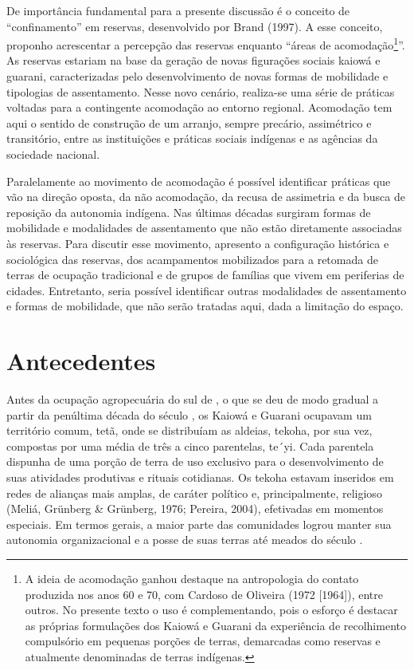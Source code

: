 De importância fundamental para a presente discussão é o conceito de
``confinamento'' em reservas, desenvolvido por Brand (1997). A esse
conceito, proponho acrescentar a percepção das reservas enquanto ``áreas
de acomodação\footnote{A ideia de acomodação ganhou destaque na
antropologia do contato produzida nos anos 60 e 70, com Cardoso de
Oliveira (1972 [1964]), entre outros. No presente texto o uso é
complementando, pois o esforço é destacar as próprias formulações dos
Kaiowá e Guarani da experiência de recolhimento compulsório em pequenas
porções de terras, demarcadas como reservas e atualmente denominadas de
terras indígenas. }''. As reservas estariam na base da geração de novas
figurações sociais kaiowá e guarani, caracterizadas pelo
desenvolvimento de novas formas de mobilidade e tipologias de
assentamento. Nesse novo cenário, realiza-se uma série de práticas
voltadas para a contingente acomodação ao entorno regional. Acomodação
tem aqui o sentido de construção de um arranjo, sempre precário,
assimétrico e transitório, entre as instituições e práticas sociais
indígenas e as agências da sociedade nacional.

Paralelamente ao movimento de acomodação é possível identificar práticas
que vão na direção oposta, da não acomodação, da recusa de assimetria e
da busca de reposição da autonomia indígena. Nas últimas décadas
surgiram formas de mobilidade e modalidades de assentamento que não
estão diretamente associadas às reservas. Para discutir esse movimento,
apresento a configuração histórica e sociológica das reservas, dos
acampamentos mobilizados para a retomada de terras de ocupação
tradicional e de grupos de famílias que vivem em periferias de cidades.
Entretanto, seria possível identificar outras modalidades de
assentamento e formas de mobilidade, que não serão tratadas aqui, dada
a limitação do espaço. 

\section{Antecedentes}

Antes da ocupação agropecuária do sul de , o que se deu de modo
gradual a partir da penúltima década do século , os Kaiowá e Guarani
ocupavam um território comum, tetã, onde se distribuíam as aldeias,
tekoha, por sua vez, compostas por uma média de três a cinco
parentelas, te´yi. Cada parentela dispunha de uma porção de terra de
uso exclusivo para o desenvolvimento de suas atividades produtivas e
rituais cotidianas. Os tekoha estavam inseridos em redes de alianças
mais amplas, de caráter político e, principalmente, religioso (Meliá,
Grünberg \& Grünberg, 1976; Pereira, 2004), efetivadas em momentos
especiais. Em termos gerais, a maior parte das comunidades logrou
manter sua autonomia organizacional e a posse de suas terras até meados
do século .

